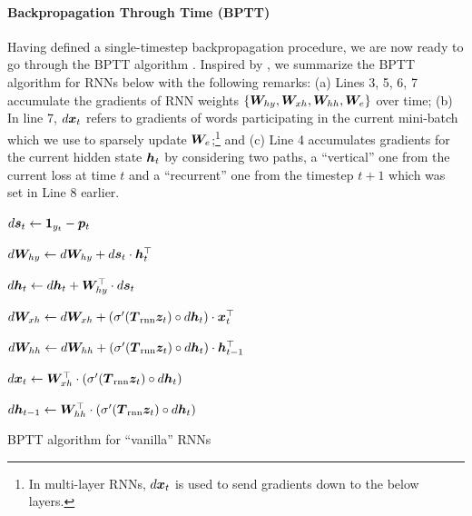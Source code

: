 \paragraph{Backpropagation Through Time (BPTT)}
Having defined a single-timestep backpropagation procedure, we are now ready to
go through the BPTT algorithm \cite{Rumelhart:1986:LPT,werbos1990}. Inspired by 
, we summarize the BPTT algorithm for RNNs below with the
following remarks: (a) Lines 3, 5, 6, 7 accumulate the gradients of RNN weights
$\{\bm{W}_{hy}, \bm{W}_{xh}, \bm{W}_{hh}, \bm{W}_{e}\}$ over time; (b) In line 7, $d\bm{x}_{t}$ refers to
gradients of words participating in the current mini-batch which we use to
sparsely update $\bm{W}_{e}$;\footnote{In multi-layer
RNNs, $d\bm{x}_{t}$ is used to send gradients down to the below layers.} and (c) Line
4 accumulates gradients for the current hidden state $\bm{h}_{t}$ by considering two paths,
a ``vertical'' one from  the current loss at time $t$ and a ``recurrent'' one from the timestep
$t+1$ which was set in Line 8 earlier.

\begin{algorithm}
{
$d\bm{s}_{t} \leftarrow \bm{1}_{y_t} - \bm{p}_{t}$

$d\bm{W}_{hy} \leftarrow d\bm{W}_{hy} + d\bm{s}_{t} \cdot \bm{h}_{t}^\top$

$d\bm{h}_{t} \leftarrow d\bm{h}_{t} + \bm{W}_{hy}^\top \cdot d\bm{s}_{t}$

$d\bm{W}_{xh} \leftarrow d\bm{W}_{xh} + \left(\sigma'(\mbox{\boldmath{$T$}}_{\text{rnn}} \bm{z}_{t}) \circ d\bm{h}_{t}\right) \cdot \bm{x}_{t}^\top$

$d\bm{W}_{hh} \leftarrow d\bm{W}_{hh} + \left(\sigma'(\mbox{\boldmath{$T$}}_{\text{rnn}} \bm{z}_{t}) \circ d\bm{h}_{t}\right) \cdot \bm{h}_{t-1}^\top$

$d\bm{x}_{t} \leftarrow \bm{W}_{xh}^\top \cdot \left(\sigma'(\mbox{\boldmath{$T$}}_{\text{rnn}} \bm{z}_{t}) \circ d\bm{h}_{t}\right)$

$d\bm{h}_{t-1} \leftarrow \bm{W}_{hh}^\top \cdot \left(\sigma'(\mbox{\boldmath{$T$}}_{\text{rnn}} \bm{z}_{t}) \circ d\bm{h}_{t}\right)$
}
\caption{BPTT algorithm for ``vanilla'' RNNs}
\end{algorithm}

